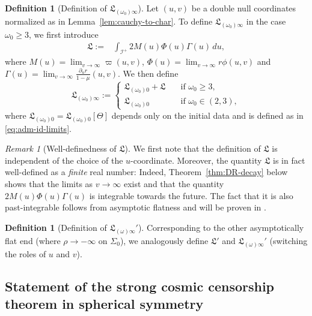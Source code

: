 \documentclass[10pt, reqno]{amsart}
\theoremstyle{definition}
\newtheorem{definition}[theorem]{Definition}
\theoremstyle{remark}
\newtheorem{remark}[theorem]{Remark}
\numberwithin{equation}{section}
\newcommand{\ud}{d}
\newcommand{\rd}{\partial}
\newcommand{\0}{\emptyset}
\newcommand{\Gmm}{\Gamma}
\newcommand{\Sgm}{\Sigma}
\newcommand{\Tht}{\Theta}
\newcommand{\omg}{\omega}
\newcommand{\calI}{\mathcal I}
\newcommand{\NI}{\calI^{+}}						%
\begin{document}
\begin{definition}[Definition of $\mathfrak{L}_{(\omg_{0}) \infty}$]\label{def.L}
Let $(u, v)$ be a double null coordinates normalized as in Lemma~\ref{lem:cauchy-to-char}. To define $\mathfrak{L}_{(\omg_{0}) \infty}$ in the case $\omg_{0} \geq 3$, we first introduce
\begin{align} \label{eq:L-def}
	\mathfrak{L} :=& \int_{\NI} 2 M(u) \Phi(u) \Gmm(u) \, \ud u,
\end{align}
where $M(u) = \lim_{v \to \infty} \varpi(u, v)$, $\Phi(u) = \lim_{v \to \infty} r \phi(u, v)$ and $\Gmm(u) = \lim_{v \to \infty} \frac{\rd_{u} r}{1- \mu}(u, v)$.
We then define
\begin{equation} \label{eq:Linfty-def}
\mathfrak{L}_{(\omg_{0}) \infty} := \begin{cases}\mathfrak{L}_{(\omg_{0}) 0} + \mathfrak{L}\quad &\mbox{if }\omg_{0}\geq 3, \\
\mathfrak{L}_{(\omg_{0}) 0}\quad &\mbox{if }\omg_{0} \in (2,3),
\end{cases}
\end{equation}
where $\mathfrak{L}_{(\omg_{0}) 0} = \mathfrak{L}_{(\omg_{0}) 0}[\Tht]$ depends only on the initial data and is defined as in \eqref{eq:adm-id-limits}. 
\end{definition}

\begin{remark}[Well-definedness of $\mathfrak L$]
We first note that the definition of $\mathfrak L$ is independent of the choice of the $u$-coordinate. Moreover, the quantity $\mathfrak{L}$ is in fact well-defined as a \emph{finite} real number: Indeed, Theorem~\ref{thm:DR-decay} below shows that the limits as $v\to \infty$ exist and that the quantity $2 M(u) \Phi(u) \Gmm(u)$ is integrable towards the future. The fact that it is also past-integrable follows from asymptotic flatness and will be proven in \cite{LO.exterior}.
\end{remark}

\begin{definition}[Definition of $\mathfrak L_{(\omg)\infty}'$]
Corresponding to the other asymptotically flat end (where $\rho \to - \infty$ on $\Sgm_{0}$), we analogously define $\mathfrak{L}'$ and $\mathfrak{L}_{(\omg) \infty}'$ (switching the roles of $u$ and $v$). 
\end{definition}
 
\subsection{Statement of the strong cosmic censorship theorem in spherical symmetry}\label{sec.statement}
\end{document}
